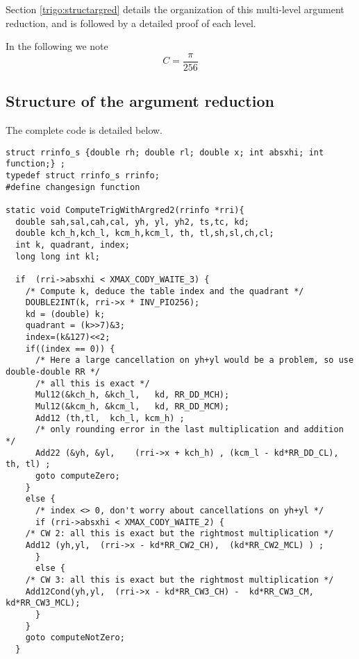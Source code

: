 Section \ref{trigo:structargred} details the organization of this
multi-level argument reduction, and is followed by a detailed proof of
each level.


In the following we note $$C=\frac{\pi}{256}$$


\subsection{Structure of the argument reduction
  \label{trigo:structargred}}
The complete code is detailed below.

\begin{lstlisting}[caption={Multilevel argument reduction},firstnumber=1]
struct rrinfo_s {double rh; double rl; double x; int absxhi; int function;} ;
typedef struct rrinfo_s rrinfo;
#define changesign function

static void ComputeTrigWithArgred2(rrinfo *rri){ 
  double sah,sal,cah,cal, yh, yl, yh2, ts,tc, kd; 
  double kch_h,kch_l, kcm_h,kcm_l, th, tl,sh,sl,ch,cl;
  int k, quadrant, index;
  long long int kl;

  if  (rri->absxhi < XMAX_CODY_WAITE_3) {
    /* Compute k, deduce the table index and the quadrant */
    DOUBLE2INT(k, rri->x * INV_PIO256);
    kd = (double) k;
    quadrant = (k>>7)&3;      
    index=(k&127)<<2;
    if((index == 0)) { 
      /* Here a large cancellation on yh+yl would be a problem, so use double-double RR */
      /* all this is exact */
      Mul12(&kch_h, &kch_l,   kd, RR_DD_MCH);
      Mul12(&kcm_h, &kcm_l,   kd, RR_DD_MCM);
      Add12 (th,tl,  kch_l, kcm_h) ;
      /* only rounding error in the last multiplication and addition */ 
      Add22 (&yh, &yl,    (rri->x + kch_h) , (kcm_l - kd*RR_DD_CL),   th, tl) ;
      goto computeZero;
    } 
    else {      
      /* index <> 0, don't worry about cancellations on yh+yl */
      if (rri->absxhi < XMAX_CODY_WAITE_2) {
	/* CW 2: all this is exact but the rightmost multiplication */
	Add12 (yh,yl,  (rri->x - kd*RR_CW2_CH),  (kd*RR_CW2_MCL) ) ; 
      }
      else { 
	/* CW 3: all this is exact but the rightmost multiplication */
	Add12Cond(yh,yl,  (rri->x - kd*RR_CW3_CH) -  kd*RR_CW3_CM,   kd*RR_CW3_MCL);
      }
    }
    goto computeNotZero;
  }


\end{lstlisting}
